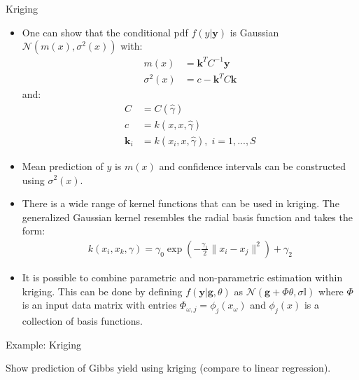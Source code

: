 \documentclass[9pt]{beamer}
\begin{document}
\begin{frame}{Kriging}

\begin{itemize}
 
\item One can show that the conditional pdf $f(y|\mathbf{y})$ is Gaussian $\mathcal{N}(m(x),\sigma^2(x))$ with:
\begin{align*}
m(x)&=\mathbf{k}^TC^{-1}\mathbf{y}\\
\sigma^2(x)&=c-\mathbf{k}^TC\mathbf{k}
\end{align*}
and:
\begin{align*}
C&=C(\hat{\gamma})\\
c&=k(x,x,\hat{\gamma})\\
\mathbf{k}_i&=k(x_i,x,\hat{\gamma}),\; i=1,...,S
\end{align*}
\item Mean prediction of $y$ is $m(x)$ and confidence intervals can be constructed using $\sigma^2(x)$.
\item There is a wide range of kernel functions that can be used in kriging. The generalized Gaussian kernel resembles the radial basis function and takes the form:
\begin{align*}
k(x_i,x_k,\gamma)=\gamma_0\exp\left(-\frac{\gamma_1}{2}\|x_i-x_j\|^2\right)+\gamma_2
\end{align*}
\item It is possible to combine parametric and non-parametric estimation within kriging. This can be done by defining $f(\mathbf{y}|\mathbf{g},\theta)$ as $\mathcal{N}(\mathbf{g}+\Phi\theta,\sigma \mathbb{I})$ where $\Phi$ is an input data matrix with entries $\Phi_{\omega,j}=\phi_j(x_\omega)$ and $\phi_j(x)$ is a collection of basis functions. 

\end{itemize}

\end{frame}

%
\begin{frame}{Example: Kriging}

\begin{block}{}
Show prediction of Gibbs yield using kriging (compare to linear regression). 
\end{block}

\end{frame}
\end{document}
